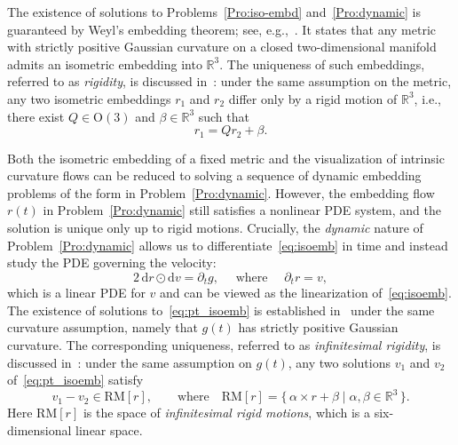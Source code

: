 \documentclass[11pt,a4paper,oneside,reqno]{amsart}
\theoremstyle{definition}
\theoremstyle{plain}
\numberwithin{theorem}{section}
\numberwithin{proposition}{section}
\numberwithin{lemma}{section}
\numberwithin{equation}{section}
\newcommand{\RM}{\mathrm{RM}}
\begin{document}
The existence of solutions to Problems~\ref{Pro:iso-embd} and~\ref{Pro:dynamic} is guaranteed by Weyl's embedding theorem; see, e.g.,~\cite[Theorem~9.0.1]{han2006isometric}.
It states that any metric with strictly positive Gaussian curvature on a closed two-dimensional manifold admits an isometric embedding into \( \mathbb{R}^3 \).
The uniqueness of such embeddings, referred to as \emph{rigidity}, is discussed in~\cite[Chapter~8]{han2006isometric}: under the same assumption on the metric, any two isometric embeddings \( r_1 \) and \( r_2 \) differ only by a rigid motion of \( \mathbb{R}^3 \), i.e., there exist \( Q \in \mathrm{O}(3) \) and \( \beta \in \mathbb{R}^3 \) such that
\begin{equation}\label{eq:Rigidity} 
r_1 = Q r_2 + \beta .
\end{equation} 


Both the isometric embedding of a fixed metric and the visualization of intrinsic curvature flows can be reduced to solving a sequence of dynamic embedding problems of the form in Problem~\ref{Pro:dynamic}.
However, the embedding flow \( r(t) \) in Problem~\ref{Pro:dynamic} still satisfies a nonlinear PDE system, and the solution is unique only up to rigid motions.
Crucially, the \emph{dynamic} nature of Problem~\ref{Pro:dynamic} allows us to differentiate~\eqref{eq:isoemb} in time and instead study the PDE governing the velocity:
\begin{equation}\label{eq:pt_isoemb}
2\,\mathrm{d}r \odot \mathrm{d}v = \partial_t g,
\quad \text{ where } \quad 
\partial_t r = v,
\end{equation}
which is a linear PDE for \(v\) and can be viewed as the linearization of~\eqref{eq:isoemb}.
The existence of solutions to~\eqref{eq:pt_isoemb} is established in~\cite[Lemma~9.2.2]{han2006isometric} under the same curvature assumption, namely that \( g(t) \) has strictly positive Gaussian curvature.
The corresponding uniqueness, referred to as \emph{infinitesimal rigidity}, is discussed in~\cite[Theorem~8.2.3]{han2006isometric}:
under the same assumption on \( g(t) \), any two solutions \( v_1 \) and \( v_2 \) of~\eqref{eq:pt_isoemb} satisfy
\begin{equation}\label{eq:inf-rigid}
v_1 - v_2 \in \RM[r],
\qquad
\text{where}\quad
\RM[r] = \{\, \alpha \times r + \beta \mid \alpha, \beta \in \mathbb{R}^3 \,\}.
\end{equation}
Here \( \RM[r] \) is the space of \emph{infinitesimal rigid motions}, which is a six-dimensional linear space.
\end{document}
